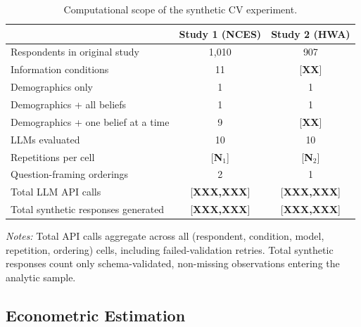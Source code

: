 \documentclass[12pt]{article}
\begin{document}
\begin{table}[h]
    \centering
    \caption{Computational scope of the synthetic CV experiment.}
    \label{tab:compute}
    \begin{threeparttable}
    \begin{tabular}{lcc}
        \toprule
                                                       & Study 1 (NCES) & Study 2 (HWA) \\
        \midrule
        Respondents in original study                  & 1{,}010        & 907 \\
        Information conditions                         & 11             & [\textbf{XX}] \\
        \quad Demographics only                        & 1              & 1 \\
        \quad Demographics + all beliefs               & 1              & 1 \\
        \quad Demographics + one belief at a time      & 9              & [\textbf{XX}] \\
        LLMs evaluated                                 & 10             & 10 \\
        Repetitions per cell                           & [\textbf{N$_1$}] & [\textbf{N$_2$}] \\
        Question-framing orderings                     & 2              & 1 \\
        Total LLM API calls                            & [\textbf{XXX,XXX}] & [\textbf{XXX,XXX}] \\
        Total synthetic responses generated            & [\textbf{XXX,XXX}] & [\textbf{XXX,XXX}] \\
        \bottomrule
    \end{tabular}
    \begin{tablenotes}\footnotesize
    \item \textit{Notes:} Total API calls aggregate across all (respondent, condition, model, repetition, ordering) cells, including failed-validation retries. Total synthetic responses count only schema-validated, non-missing observations entering the analytic sample.
    \end{tablenotes}
    \end{threeparttable}
\end{table}

\subsection{Econometric Estimation}\label{sec:methods-econ}
\end{document}
